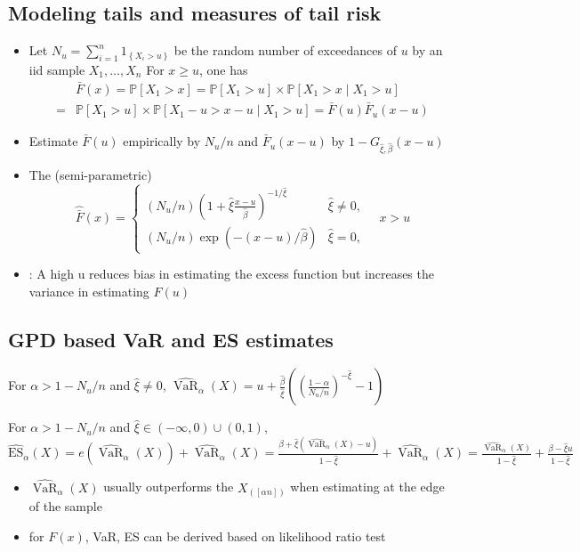 \subsection*{Modeling tails and measures of tail risk}
\begin{itemize}[leftmargin=*]
    \item Let $N_{u}=\sum_{i=1}^{n} 1_{\left\{X_{i}>u\right\}}$ be the random number of exceedances of $u$ by an iid sample $X_{1}, \ldots, X_{n}$
For $x \geq u$, one has
$$
\begin{aligned}
&\bar{F}(x) =\mathbb{P}\left[X_{1}>x\right]=\mathbb{P}\left[X_{1}>u\right] \times \mathbb{P}\left[X_{1}>x \mid X_{1}>u\right] \\
=&\mathbb{P}\left[X_{1}>u\right] \times \mathbb{P}\left[X_{1}-u>x-u \mid X_{1}>u\right]=\bar{F}(u) \bar{F}_{u}(x-u)
\end{aligned}
$$
    \item Estimate $\bar{F}(u)$ empirically by $N_{u} / n$ and $\bar{F}_{u}(x-u)$ by $1-G_{\hat{\xi}, \hat{\beta}}(x-u)$
    \item The (semi-parametric) 
$$
\hat{\bar{F}}(x)=\left\{\begin{array}{ll}
\left(N_{u} / n\right)\left(1+\hat{\xi} \frac{x-u}{\hat{\beta}}\right)^{-1 / \hat{\xi}} & \hat{\xi} \neq 0, \\
\left(N_{u} / n\right) \exp (-(x-u) / \hat{\beta}) & \hat{\xi}=0,
\end{array} \quad x>u\right.
$$
    \item {}: A high u reduces bias in estimating the excess function but increases
the variance in estimating $F(u)$
\end{itemize}





\subsection*{GPD based VaR and ES estimates}
For $\alpha>1-N_{u} / n$ and $\hat{\xi} \neq 0$,
$
\widehat{\operatorname{VaR}}_{\alpha}(X)=u+\frac{\hat{\beta}}{\hat{\xi}}\left(\left(\frac{1-\alpha}{N_{u} / n}\right)^{-\hat{\xi}}-1\right)
$

For $\alpha>1-N_{u} / n$ and $\hat{\xi} \in(-\infty, 0) \cup(0,1)$,
$
\widehat{\mathrm{ES}}_{\alpha}(X)=e\left(\widehat{\operatorname{VaR}}_{\alpha}(X)\right)+\widehat{\operatorname{VaR}}_{\alpha}(X)=\frac{\beta+\hat{\xi}\left(\widehat{\operatorname{VaR}}_{\alpha}(X)-u\right)}{1-\hat{\xi}}+\widehat{\operatorname{VaR}}_{\alpha}(X)=\frac{\widehat{\operatorname{VaR}}_{\alpha}(X)}{1-\hat{\xi}}+\frac{\beta-\hat{\xi} u}{1-\hat{\xi}}
$

\begin{itemize}[leftmargin=*]
    \item $\widehat{\operatorname{VaR}}_{\alpha}(X)$ usually outperforms the  $X_{([\alpha n])}$ when estimating at the edge of the sample
    \item {} for $F(x)$, VaR, ES can be derived based on likelihood ratio test
\end{itemize}
